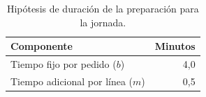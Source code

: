\begin{table}[htbp]\centering
\caption{Hipótesis de duración de la preparación para la jornada.}
\label{tab:servicio}
\begin{tabular}{lr}\toprule Componente & Minutos \\ \midrule
Tiempo fijo por pedido ($b$) & 4,0 \\
Tiempo adicional por línea ($m$) & 0,5 \\
\bottomrule\end{tabular}\end{table}
